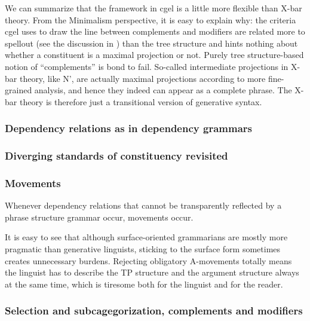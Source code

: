 \documentclass[../main.tex]{subfiles}
\begin{document}
We can summarize that the framework in \ac{cgel} is a little more flexible than X-bar theory. 
From the Minimalism perspective, it is easy to explain why: the criteria \ac{cgel} uses to draw the line 
between complements and modifiers are related more to spellout (see the discussion in )
than the tree structure and hints nothing about whether a constituent is a maximal projection or not. 
Purely tree structure-based notion of ``complements'' is bond to fail. 
So-called intermediate projections in X-bar theory, like N', are actually maximal projections according to 
more fine-grained analysis, and hence they indeed can appear as a complete phrase.
The X-bar theory is therefore just a transitional version of generative syntax.

\subsubsection{Dependency relations as in dependency grammars}\label{sec:dependency}

\subsubsection{Diverging standards of constituency revisited}

\subsubsection{Movements}

Whenever dependency relations that cannot be transparently reflected by a phrase structure grammar occur,
movements occur.

It is easy to see that although surface-oriented grammarians are mostly more pragmatic than generative 
linguists, sticking to the surface form sometimes creates unnecessary burdens. Rejecting obligatory 
A-movements totally means the linguist has to describe the TP structure and the argument structure 
always at the same time, which is tiresome both for the linguist and for the reader. 

\subsubsection{Selection and subcagegorization, complements and modifiers}\label{sec:sub-cat}
\end{document}
